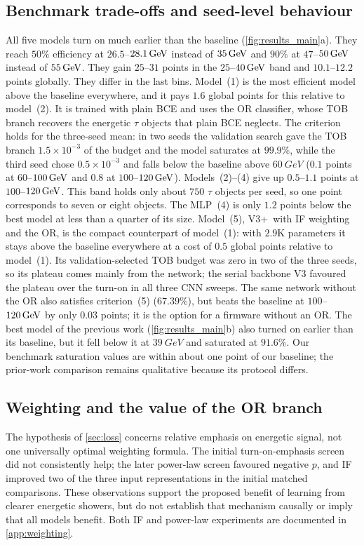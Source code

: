 \subsection{Benchmark trade-offs and seed-level behaviour}
\label{app:benchmark_detail}
All five models turn on much earlier than the baseline (\cref{fig:results_main}a). They reach $50\%$ efficiency at $26.5$--$28.1\,\mathrm{GeV}$ instead of $35\,\mathrm{GeV}$ and $90\%$ at $47$--$50\,\mathrm{GeV}$ instead of $55\,\mathrm{GeV}$. They gain $25$--$31$ points in the $25$--$40\,\mathrm{GeV}$ band and $10.1$--$12.2$ points globally. They differ in the last bins. Model~(1) is the most efficient model above the baseline everywhere, and it pays $1.6$ global points for this relative to model~(2). It is trained with plain BCE and uses the OR classifier, whose TOB branch recovers the energetic $\tau$ objects that plain BCE neglects. The criterion holds for the three-seed mean: in two seeds the validation search gave the TOB branch $1.5\times10^{-3}$ of the budget and the model saturates at $99.9\%$, while the third seed chose $0.5\times10^{-3}$ and falls below the baseline above $\SI{60}{GeV}$ ($0.1$ points at $60$--$100\,\mathrm{GeV}$ and $0.8$ at $100$--$120\,\mathrm{GeV}$). Models~(2)--(4) give up $0.5$--$1.1$ points at $100$--$120\,\mathrm{GeV}$. This band holds only about $750$ $\tau$ objects per seed, so one point corresponds to seven or eight objects. The MLP~(4) is only $1.2$ points below the best model at less than a quarter of its size. Model~(5), V3+\Ffeat\ with IF weighting and the OR, is the compact counterpart of model~(1): with $2.9$K parameters it stays above the baseline everywhere at a cost of $0.5$ global points relative to model~(1). Its validation-selected TOB budget was zero in two of the three seeds, so its plateau comes mainly from the network; the serial backbone V3 favoured the plateau over the turn-on in all three CNN sweeps. The same network without the OR also satisfies criterion~(5) ($67.39\%$), but beats the baseline at $100$--$120\,\mathrm{GeV}$ by only $0.03$ points; it is the option for a firmware without an OR. The best model of the previous work (\cref{fig:results_main}b) also turned on earlier than its baseline, but it fell below it at $\SI{39}{GeV}$ and saturated at $91.6\%$. Our benchmark saturation values are within about one point of our baseline; the prior-work comparison remains qualitative because its protocol differs.

\subsection{Weighting and the value of the OR branch}
\label{app:analysis_weighting}
The hypothesis of \cref{sec:loss} concerns relative emphasis on energetic signal, not one universally optimal weighting formula. The initial turn-on-emphasis screen did not consistently help; the later power-law screen favoured negative $p$, and IF improved two of the three input representations in the initial matched comparisons. These observations support the proposed benefit of learning from clearer energetic showers, but do not establish that mechanism causally or imply that all models benefit. Both IF and power-law experiments are documented in \cref{app:weighting}.

